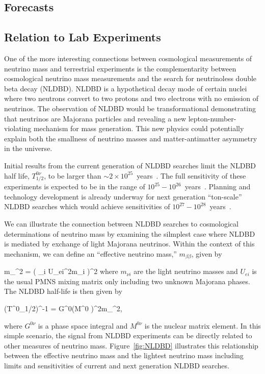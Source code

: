 \subsection{Forecasts}

\subsection{Relation to Lab Experiments}\label{sec:lab}

One of the more interesting connections between cosmological measurements of neutrino mass and terrestrial experiments is the complementarity between cosmological neutrino mass measurements and the search for neutrinoless double beta decay (NLDBD). NLDBD is a hypothetical decay mode of certain nuclei where two neutrons convert to two protons and two electrons with no emission of neutrinos. The observation of NLDBD would be transformational demonstrating that neutrinos are Majorana particles and revealing a new lepton-number-violating mechanism for mass generation. This new physics could potentially explain both the smallness of neutrino masses and matter-antimatter asymmetry in the universe.

Initial results from the current generation of NLDBD searches limit the NLDBD half life, $T^{0\nu}_{1/2}$, to be larger than  $\sim2\times10^{25}$~years~\cite{Gerda, Exo, Cuore}. The full sensitivity of these experiments is expected to be in the range of $10^{25}-10^{26}$~years~\cite{NSAC}. Planning and technology development is already underway for next generation ``ton-scale'' NLDBD searches which would achieve sensitivities of $10^{27}-10^{28}$~years~\cite{NSAC}.

We can illustrate the connection between NLDBD searches to cosmological determinations of neutrino mass by examining the silmplest case where NLDBD is mediated by exchange of light Majorana neutrinos. Within the context of this mechanism, we can define an ``effective neutrino mass,'' $m_{\beta\beta}$, given by 

\beq
m_{\beta\beta}^{2} = ( \sum_i U_{ei}^{2}m_{\nu i} )^{2}
\label{eq:mbb}
\eeq
where $m_{\nu i}$ are the light neutrino masses and $U_{ei}$ is the usual PMNS mixing matrix only including two unknown Majorana phases. The NLDBD half-life is then given by 

\beq
(T^{0\nu}_{1/2})^{-1} = G^{0\nu}\cdot (M^{0\nu} )^{2}\cdot m_{\beta\beta}^2,
\eeq

where $G^{0\nu}$ is a phase space integral and $M^{0\nu}$ is the nuclear matrix element. In this simple scenario, the signal from NLDBD experiments can be directly related to other measures of neutrino mass. Figure~\ref{fig:NLDBD} illustrates this relationship between the effective neutrino mass and the lightest neutrino mass including limits and sensitivities of current and next generation NLDBD searches.

